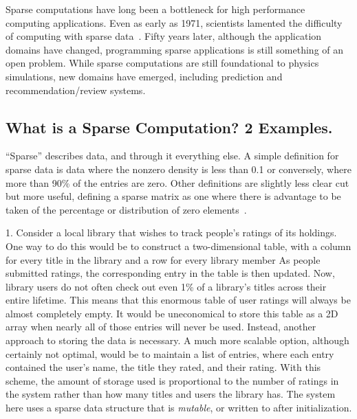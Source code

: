 Sparse computations have long been a bottleneck for high performance computing applications. 
Even as early as 1971, scientists lamented the difficulty of computing with sparse data~\cite{willoughby1971sparse}.
Fifty years later, although the application domains have changed, programming sparse applications is still something of an open problem.
While sparse computations are still foundational to physics simulations, new domains have emerged, including prediction and recommendation/review systems.

\subsection{What is a Sparse Computation? 2 Examples.}

``Sparse'' describes data, and through it everything else. 
A simple definition for sparse data is data where the nonzero density is less than 0.1 or conversely, where more than 90\% of the entries are zero.
Other definitions are slightly less clear cut but more useful, defining a sparse matrix as one where there is advantage to be taken of the percentage or distribution of zero elements~\cite{duff1977survey}.

1.
Consider a local library that wishes to track people's ratings of its holdings.
One way to do this would be to construct a two-dimensional table, with a column for every title in the library and a row for every library member
As people submitted ratings, the corresponding entry in the table is then updated.
Now, library users do not often check out even 1\% of a library's titles across their entire lifetime.
This means that this enormous table of user ratings will always be almost completely empty.
It would be uneconomical to store this table as a 2D array when nearly all of those entries will never be used.
Instead, another approach to storing the data is necessary.
A much more scalable option, although certainly not optimal, would be to maintain a list of entries, where each entry contained the user's name, the title they rated, and their rating.
With this scheme, the amount of storage used is proportional to the number of ratings in the system rather than how many titles and users the library has.
The system here uses a sparse data structure that is \textit{mutable}, or written to after initialization.

